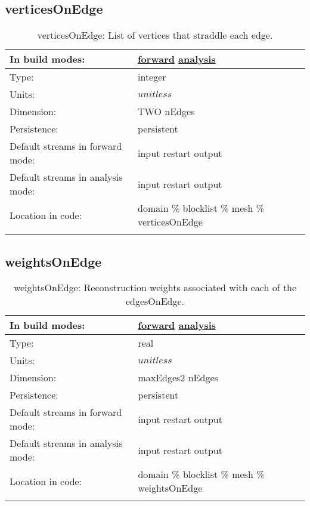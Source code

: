 \subsection[verticesOnEdge]{verticesOnEdge}
\label{subsec:var_sec_mesh_verticesOnEdge}
\begin{center}
\begin{longtable}{| p{2.0in} | p{4.0in} |}
        \hline 
        In build modes: & \hyperref[subsec:forward_var_tab_mesh]{forward} \hyperref[subsec:analysis_var_tab_mesh]{analysis} \\
        \hline 
        Type: & integer \\
        \hline 
        Units: & $unitless$ \\
        \hline 
        Dimension: & TWO nEdges \\
        \hline 
        Persistence: & persistent \\
        \hline 
		 Default streams in forward mode: &  input restart output \\
        \hline 
		 Default streams in analysis mode: &  input restart output \\
        \hline 
		 Location in code: & domain \% blocklist \% mesh \% verticesOnEdge \\
		 \hline 
    \caption{verticesOnEdge: List of vertices that straddle each edge.}
\end{longtable}
\end{center}
\subsection[weightsOnEdge]{weightsOnEdge}
\label{subsec:var_sec_mesh_weightsOnEdge}
\begin{center}
\begin{longtable}{| p{2.0in} | p{4.0in} |}
        \hline 
        In build modes: & \hyperref[subsec:forward_var_tab_mesh]{forward} \hyperref[subsec:analysis_var_tab_mesh]{analysis} \\
        \hline 
        Type: & real \\
        \hline 
        Units: & $unitless$ \\
        \hline 
        Dimension: & maxEdges2 nEdges \\
        \hline 
        Persistence: & persistent \\
        \hline 
		 Default streams in forward mode: &  input restart output \\
        \hline 
		 Default streams in analysis mode: &  input restart output \\
        \hline 
		 Location in code: & domain \% blocklist \% mesh \% weightsOnEdge \\
		 \hline 
    \caption{weightsOnEdge: Reconstruction weights associated with each of the edgesOnEdge.}
\end{longtable}
\end{center}

